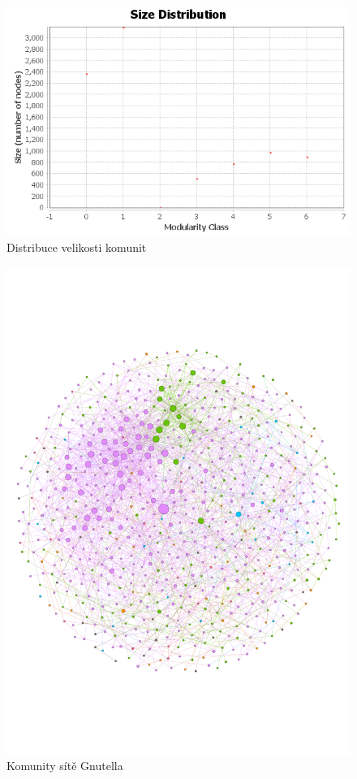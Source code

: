 \documentclass[A4]{article}
\begin{document}
\begin{figure}
    \centering
    \includegraphics[width=1\textwidth]{modularity/sizes-of-modularities/communities-size-distribution.png}
    \caption{Distribuce velikosti komunit}
    \label{communities}
\end{figure}

\begin{figure}
    \centering
    \includegraphics[width=1\textwidth]{communities.pdf}
    \caption{Komunity sítě Gnutella}
    \label{communities:graph}
\end{figure}
\end{document}
